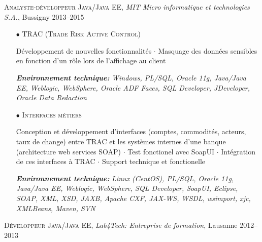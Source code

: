 \documentclass[11pt,a4paper]{moderncv}
\begin{document}
\begin{tcolorbox}[boxrule=0pt,arc=0pt,colback=lightgray]{\textsc{Analyste-développeur Java/Java EE}, \emph{MIT Micro informatique et technologies S.A.}, Bussigny \hfill 2013--2015}
\end{tcolorbox}
\begin{itemize}
		
	\item[$\bullet$] \textsc{TRAC (Trade Risk Active Control)}
	\item[] Développement de nouvelles fonctionnalités $\cdot$ Masquage des données sensibles en fonction d'un rôle lors de l'affichage au client
	\item[] \emph{\textbf{Environnement technique:}} \emph{Windows, PL/SQL, Oracle 11g, Java/Java EE, Weblogic, WebSphere, Oracle ADF Faces, SQL Developer, JDeveloper, Oracle Data Redaction}

	\item[$\bullet$] \textsc{Interfaces métiers}
	\item[] Conception et développement d'interfaces (comptes, commodités, acteurs, taux de change) entre TRAC et les systèmes internes d'une banque (architecture web services SOAP) $\cdot$ Test fonctionel avec SoapUI $\cdot$ Intégration de ces interfaces à TRAC $\cdot$  Support technique et fonctionelle
	\item[] \emph{\textbf{Environnement technique:}} \emph{Linux (CentOS), PL/SQL, Oracle 11g, Java/Java EE, Weblogic, WebSphere, SQL Developer, SoapUI, Eclipse, SOAP, XML, XSD, JAXB, Apache CXF, JAX-WS, WSDL, wsimport, xjc, XMLBeans, Maven, SVN}	      	      	
\end{itemize}



\begin{tcolorbox}[boxrule=0pt,arc=0pt,colback=lightgray]{\textsc{Développeur Java/Java EE}, \emph{Lab4Tech: Entreprise de formation}, Lausanne \hfill 2012--2013}
\end{tcolorbox}
\end{document}
